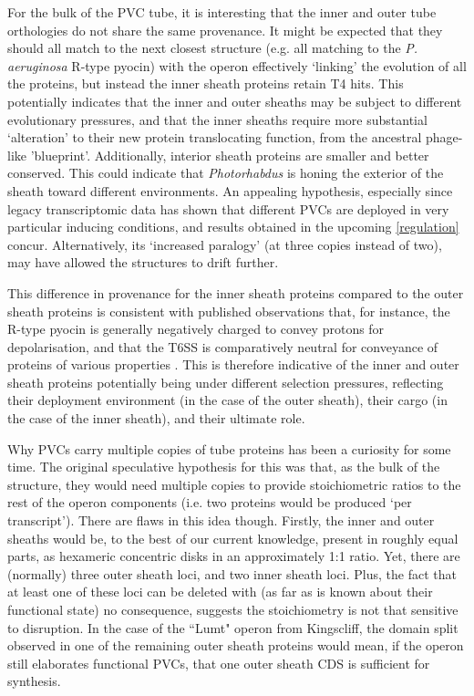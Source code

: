 For the bulk of the PVC tube, it is interesting that the inner and outer tube orthologies do not share the same provenance. It might be expected that they should all match to the next closest structure (e.g. all matching to the \emph{P. aeruginosa} R-type pyocin) with the operon effectively `linking' the evolution of all the proteins, but instead the inner sheath proteins retain T4 hits. This potentially indicates that the inner and outer sheaths may be subject to different evolutionary pressures, and that the inner sheaths require more substantial `alteration' to their new protein translocating function, from the ancestral phage-like 'blueprint'. Additionally, interior sheath proteins are smaller and better conserved. This could indicate that \emph{Photorhabdus} is honing the exterior of the sheath toward different environments. An appealing hypothesis, especially since legacy transcriptomic data has shown that different PVCs are deployed in very particular inducing conditions, and results obtained in the upcoming \vref{regulation} concur. Alternatively, its `increased paralogy' (at three copies instead of two), may have allowed the structures to drift further.

This difference in provenance for the inner sheath proteins compared to the outer sheath proteins is consistent with published observations that, for instance, the R-type pyocin is generally negatively charged to convey protons for depolarisation, and that the T6SS is comparatively neutral for conveyance of proteins of various properties \citep{Ge2015}. This is therefore indicative of the inner and outer sheath proteins potentially being under different selection pressures, reflecting their deployment environment (in the case of the outer sheath), their cargo (in the case of the inner sheath), and their ultimate role.

Why PVCs carry multiple copies of tube proteins has been a curiosity for some time. The original speculative hypothesis for this was that, as the bulk of the structure, they would need multiple copies to provide stoichiometric ratios to the rest of the operon components (i.e. two proteins would be produced `per transcript'). There are flaws in this idea though. Firstly, the inner and outer sheaths would be, to the best of our current knowledge, present in roughly equal parts, as hexameric concentric disks in an approximately 1:1 ratio. Yet, there are (normally) three outer sheath loci, and two inner sheath loci. Plus, the fact that at least one of these loci can be deleted with (as far as is known about their functional state) no consequence, suggests the stoichiometry is not that sensitive to disruption. In the case of the ``Lumt" operon from \Pasy{} Kingscliff, the domain split observed in one of the remaining outer sheath proteins would mean, if the operon still elaborates functional PVCs, that one outer sheath CDS is sufficient for synthesis.

